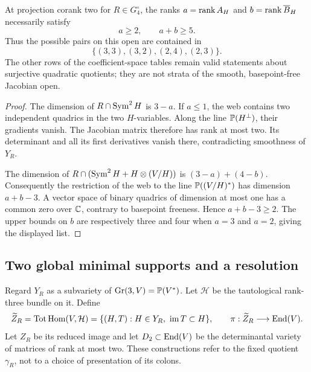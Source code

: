 \begin{proposition}
\label{prop:smooth-web-rank-admissibility}
At projection corank two for \(R\in G_4^\circ\), the ranks
\(a=\operatorname{rank} A_H\) and \(b=\operatorname{rank}\overline B_H\) necessarily satisfy
\[
 a\ge2,\qquad a+b\ge5.
\]
Thus the possible pairs on this open are contained in
\[
 \{(3,3),(3,2),(2,4),(2,3)\}.
\]
The other rows of the coefficient-space tables remain valid statements
about surjective quadratic quotients; they are not strata of the
smooth, basepoint-free Jacobian open.
\end{proposition}
\begin{proof}
The dimension of \(R\cap\operatorname{Sym}^2H\) is \(3-a\).  If \(a\le1\),
the web contains two independent quadrics in the two \(H\)-variables.
Along the line \(\mathbb P(H^\perp)\), their gradients vanish.  The
Jacobian matrix therefore has rank at most two.  Its determinant and
all its first derivatives vanish there, contradicting smoothness of
\(Y_R\).

The dimension of
\(R\cap(\operatorname{Sym}^2H+H\otimes(V/H))\) is \((3-a)+(4-b)\).
Consequently the restriction of the web to the line
\(\mathbb P((V/H)^*)\) has dimension \(a+b-3\).  A vector space of
binary quadrics of dimension at most one has a common zero over
\(\mathbb C\), contrary to basepoint freeness.  Hence \(a+b-3\ge2\).
The upper bounds on \(b\) are respectively three and four when
\(a=3\) and \(a=2\), giving the displayed list.
\end{proof}

\subsection{Two global minimal supports and a resolution}

Regard \(Y_R\) as a subvariety of \(\operatorname{Gr}(3,V)=\mathbb P(V^*)\).  Let
\(\mathcal H\) be the tautological rank-three bundle on it.  Define
\[
 \widetilde Z_R=\operatorname{Tot}\operatorname{Hom}(V,\mathcal H)
 =\{(H,T):H\in Y_R,\ \operatorname{im}T\subset H\},
 \qquad \pi:\widetilde Z_R\longrightarrow\operatorname{End}(V).
\]
Let \(Z_R\) be its reduced image and let
\(D_2\subset\operatorname{End}(V)\) be the determinantal variety of matrices of
rank at most two.  These constructions refer to the fixed quotient
\(\gamma_R\), not to a choice of presentation of its colons.

